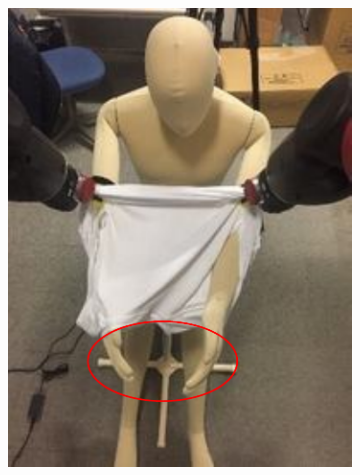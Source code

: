 \documentclass[sigconf]{acmart}
\begin{document}
\begin{figure}
\begin{subfigure}{.4\linewidth}
		\includegraphics[width=.98\linewidth]{failure_scenario_3}
	\end{subfigure}%
	\begin{subfigure}{.4\linewidth}

\end{subfigure}
\end{figure}
\end{document}
